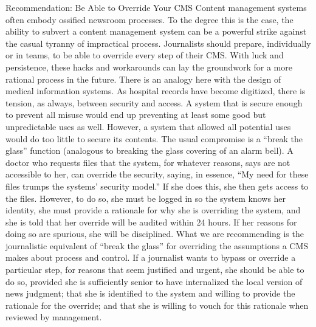 Recommendation: Be Able to Override Your CMS
Content management systems often embody ossified newsroom processes.
To the degree this is the case, the ability to subvert a content
management system can be a powerful strike against the casual tyranny
of impractical process. Journalists should prepare, individually or
in teams, to be able to override every step of their CMS. With luck and
persistence, these hacks and workarounds can lay the groundwork for a
more rational process in the future.
There is an analogy here with the design of medical information systems.
As hospital records have become digitized, there is tension, as
always, between security and access. A system that is secure enough
to prevent all misuse would end up preventing at least some good but
unpredictable uses as well. However, a system that allowed all potential
uses would do too little to secure its contents.
The usual compromise is a ``break the glass'' function (analogous to
breaking the glass covering of an alarm bell). A doctor who requests
files that the system, for whatever reasons, says are not accessible to
her, can override the security, saying, in essence, ``My need for these
files trumps the systems’ security model.'' If she does this, she then gets
access to the files.
However, to do so, she must be logged in so the system knows her identity,
she must provide a rationale for why she is overriding the system,
and she is told that her override will be audited within 24 hours. If her
reasons for doing so are spurious, she will be disciplined.
What we are recommending is the journalistic equivalent of ``break
the glass'' for overriding the assumptions a CMS makes about process
and control. If a journalist wants to bypass or override a particular step,
for reasons that seem justified and urgent, she should be able to do so,
provided she is sufficiently senior to have internalized the local version
of news judgment; that she is identified to the system and willing to
provide the rationale for the override; and that she is willing to vouch
for this rationale when reviewed by management.

